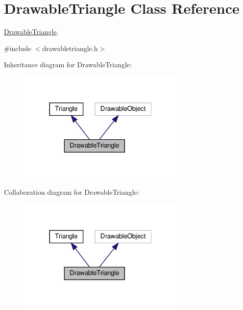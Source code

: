 \hypertarget{classDrawableTriangle}{}\section{Drawable\+Triangle Class Reference}
\label{classDrawableTriangle}


\hyperlink{classDrawableTriangle}{Drawable\+Triangle}.  




{\ttfamily \#include $<$drawabletriangle.\+h$>$}



Inheritance diagram for Drawable\+Triangle\+:\nopagebreak
\begin{figure}[H]
\begin{center}
\leavevmode
\includegraphics[width=236pt]{classDrawableTriangle__inherit__graph}
\end{center}
\end{figure}


Collaboration diagram for Drawable\+Triangle\+:\nopagebreak
\begin{figure}[H]
\begin{center}
\leavevmode
\includegraphics[width=236pt]{classDrawableTriangle__coll__graph}
\end{center}
\end{figure}
